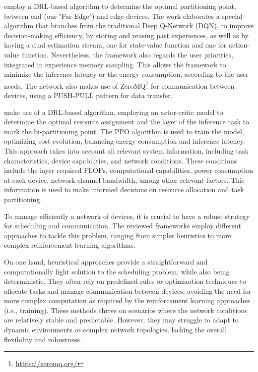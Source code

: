 \begin{description}[style=unboxed, leftmargin=1cm, font=\bfseries]

    \item[\textcite{chen_deep_2024}]
    employ a \ac{DRL}-based algorithm to determine the optimal partitioning point,
    between end (our "Far-Edge") and edge devices. The work elaborates a special 
    algorithm that
    branches from the traditional Deep Q-Network (DQN), to improve decision-making
    efficiency, by storing and reusing past experiences, as well as by having a dual 
    estimation stream, one for state-value function and one for action-value function. 
    Nevertheless, the framework also regards the user priorities, integrated in
    experience memory sampling. This allows the framework to minimize the inference
    latency or the energy consumption, according to the user needs. 
    The network also makes use of ZeroMQ\footnote{\url{https://zeromq.org/}} 
    for communication between devices, using a PUSH-PULL pattern for data transfer.  

    \item[\textcite{ma_joint_2025}]
    make use of a \ac{DRL}-based algorithm, employing an actor-critic model to
    determine the optimal resource assignment and the layer of the inference task 
    to mark the bi-partitioning point. The \ac{PPO} algorithm is used to train the 
    model, optimizing cost evolution, balancing energy consumption and inference 
    latency. This approach takes into account all relevant system information, 
    including task characteristics, device capabilities, and network conditions.
    These conditions include the layer required \acp{FLOP}, computational 
    capabilities, power consumption at each device, network channel bandwidth, 
    among other relevant factors. 
    This information is used to make informed decisions on resource allocation
    and task partitioning.

\end{description}

To manage efficiently a network of devices, it is crucial to have a robust
strategy for scheduling and communication. The reviewed frameworks employ
different approaches to tackle this problem, ranging from simpler heuristics
to more complex reinforcement learning algorithms. 

On one hand, heuristical approaches provide a straightforward and computationally
light solution to the scheduling problem, while also being deterministic. They 
often rely on predefined rules or optimization techniques to allocate 
tasks and manage communication between devices, avoiding the need for more complex
computation as required by the reinforcement learning approaches (i.e., training).
These methods thrive on scenarios where the network conditions are relatively 
stable and predictable. However, they may struggle to adapt to dynamic 
environments or complex network topologies, lacking the overall flexibility and 
robustness.

